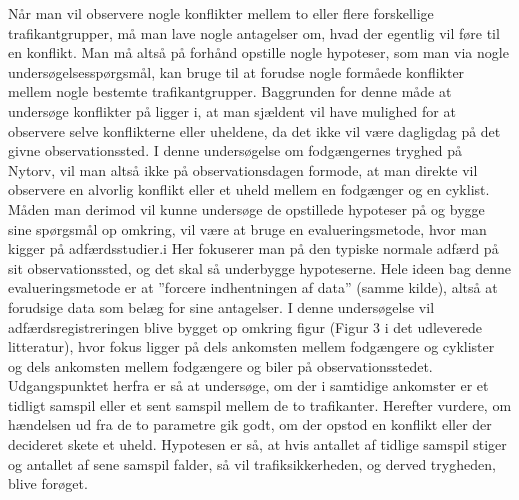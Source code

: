 Når	man	vil	observere	nogle	konflikter	mellem	to	eller	flere	forskellige
trafikantgrupper,	må	man	lave	nogle	antagelser	om,	hvad	der	egentlig	vil	føre	til	en
konflikt.	Man	må	altså	på	forhånd	opstille	nogle	hypoteser,	som	man	via	nogle
undersøgelsesspørgsmål,	kan	bruge	til	at	forudse	nogle	formåede	konflikter	mellem
nogle	bestemte	trafikantgrupper.	Baggrunden	for	denne	måde	at	undersøge
konflikter	på ligger	i,	at	man	sjældent	vil	have	mulighed	for	at	observere	selve
konflikterne	eller	uheldene,	da	det	ikke	vil	være	dagligdag	på	det	givne
observationssted.	I	denne	undersøgelse	om	fodgængernes	tryghed	på	Nytorv,	vil
man altså	ikke	på	observationsdagen	formode,	at	man direkte	vil	observere en
alvorlig	konflikt	eller	et	uheld	mellem	en	fodgænger	og	en	cyklist.	Måden	man
derimod	vil	kunne	undersøge	de	opstillede	hypoteser	på	og	bygge	sine	spørgsmål	op
omkring,	vil	være	at	bruge	en	evalueringsmetode,	hvor	man	kigger	på
adfærdsstudier.i Her	fokuserer	man	på	den	typiske	normale	adfærd	på	sit
observationssted, og	det	skal	så	underbygge	hypoteserne. Hele	ideen	bag	denne
evalueringsmetode	er	at	”forcere	indhentningen	af	data”	(samme	kilde),	altså	at
forudsige	data	som	belæg	for	sine	antagelser.
I	denne	undersøgelse	vil	adfærdsregistreringen	blive	bygget	op	omkring	figur	(Figur
3	i	det	udleverede	litteratur),	hvor	fokus	ligger	på	dels	ankomsten	mellem
fodgængere	og	cyklister	og	dels	ankomsten	mellem	fodgængere	og	biler på
observationsstedet. Udgangspunktet	herfra	er	så	at	undersøge,	om	der	i	samtidige
ankomster	er	et	tidligt	samspil	eller	et	sent	samspil	mellem	de	to	trafikanter.
Herefter	vurdere,	om	hændelsen ud	fra	de	to	parametre	gik	godt,	om	der	opstod	en
konflikt	eller	der	decideret	skete	et	uheld.	Hypotesen	er	så,	at	hvis	antallet	af	tidlige
samspil	stiger	og	antallet	af	sene	samspil	falder,	så	vil	trafiksikkerheden,	og	derved
trygheden,	blive	forøget.
